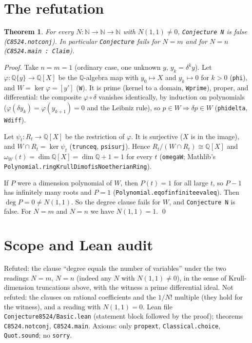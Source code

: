 \documentclass[11pt]{article}
\renewcommand{\_}{\oldus\allowbreak}
\newtheorem{theorem}{Theorem}
\theoremstyle{definition}
\newcommand{\Q}{\mathbb{Q}}
\begin{document}
\section{The refutation}

\begin{theorem}\label{thm:main}
For every $N:\mathbb{N}\to\mathbb{N}\to\mathbb{N}$ with $N(1,1)\ne0$, \texttt{Conjecture N} is false
(\texttt{C8524.not\_conj}). In particular \texttt{Conjecture} fails for $N=m$ and for $N=n$
(\texttt{C8524.main : Claim}).
\end{theorem}

\begin{proof}
Take $n=m=1$ (ordinary case, one unknown $y$, $y_k=\delta^k y$). Let $\varphi:\Q\{y\}\to\Q[X]$ be the
$\Q$-algebra map with $y_0\mapsto X$ and $y_k\mapsto0$ for $k>0$ (\texttt{phi}), and $W=\ker\varphi=[y']$
(\texttt{W}). It is prime (kernel to a domain, \texttt{W\_prime}), proper, and differential: the composite
$\varphi\circ\delta$ vanishes identically, by induction on polynomials ($\varphi(\delta y_k)=\varphi(y_{k+1})=0$ and
the Leibniz rule), so $p\in W\Rightarrow\delta p\in W$ (\texttt{phi\_delta}, \texttt{W\_diff}).

Let $\psi_t:R_t\to\Q[X]$ be the restriction of $\varphi$. It is surjective ($X$ is in the image), and
$W\cap R_t=\ker\psi_t$ (\texttt{trunc\_eq}, \texttt{psi\_surj}). Hence $R_t/(W\cap R_t)\cong\Q[X]$ and
$\omega_W(t)=\dim\Q[X]=\dim\Q+1=1$ for every $t$ (\texttt{omega\_W}; Mathlib's
\texttt{Polynomial.ringKrullDim\_of\_isNoetherianRing}).

If $P$ were a dimension polynomial of $W$, then $P(t)=1$ for all large $t$, so $P-1$ has infinitely many roots
and $P=1$ (\texttt{Polynomial.eq\_of\_infinite\_eval\_eq}). Then $\deg P=0\neq N(1,1)$. So the degree clause
fails for $W$, and \texttt{Conjecture N} is false. For $N=m$ and $N=n$ we have $N(1,1)=1$. \qed
\end{proof}

\section{Scope and Lean audit}

Refuted: the clause ``degree equals the number of variables'' under the two readings $N=m$, $N=n$ (indeed any
$N$ with $N(1,1)\neq0$), in the sense of Krull-dimension truncations above, with the witness a prime differential
ideal. Not refuted: the clauses on rational coefficients and the $1/N!$ multiple (they hold for the witness), and a
reading with $N(1,1)=0$. Lean file \texttt{Conjecture8524/Basic.lean} (statement block followed by the proof);
theorems \texttt{C8524.not\_conj}, \texttt{C8524.main}. Axioms: only \texttt{propext}, \texttt{Classical.choice},
\texttt{Quot.sound}; no \texttt{sorry}.
\end{document}
